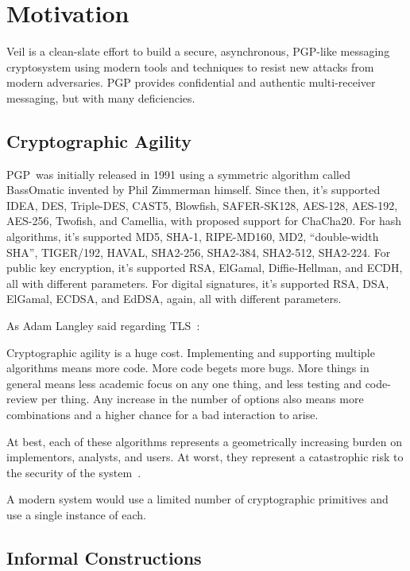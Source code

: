 \section{Motivation}\label{sec:motivation}

Veil is a clean-slate effort to build a secure, asynchronous, PGP-like messaging cryptosystem using modern tools and
techniques to resist new attacks from modern adversaries.
PGP provides confidential and authentic multi-receiver messaging, but with many deficiencies.

\subsection{Cryptographic Agility}\label{subsec:cryptographic-agility}

PGP~was initially released in 1991 using a symmetric algorithm called BassOmatic invented by Phil
Zimmerman himself.
Since then, it's supported IDEA, DES, Triple-DES, CAST5, Blowfish,
SAFER-SK128, AES-128, AES-192, AES-256, Twofish, and Camellia,
with proposed support for ChaCha20.
For hash algorithms, it's supported MD5, SHA-1, RIPE-MD160, MD2, ``double-width SHA'', TIGER/192, HAVAL, SHA2-256,
SHA2-384, SHA2-512, SHA2-224.
For public key encryption, it's supported RSA, ElGamal, Diffie-Hellman, and ECDH, all with different parameters.
For digital signatures, it's supported RSA, DSA, ElGamal, ECDSA, and EdDSA, again, all with different parameters.

As Adam Langley said regarding TLS~\cite{langley2016}:

\begin{displayquote}
    Cryptographic agility is a huge cost.
    Implementing and supporting multiple algorithms means more code.
    More code begets more bugs.
    More things in general means less academic focus on any one thing, and less testing and code-review per thing.
    Any increase in the number of options also means more combinations and a higher chance for a bad interaction to
    arise.
\end{displayquote}

At best, each of these algorithms represents a geometrically increasing burden on implementors, analysts, and users.
At worst, they represent a catastrophic risk to the security of the system~\cite{nguyen2004, blessing2021}.

A modern system would use a limited number of cryptographic primitives and use a single instance of each.

\subsection{Informal Constructions}\label{subsec:informal-constructions}


